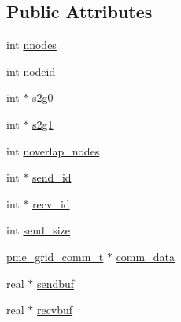 \subsection*{\-Public \-Attributes}
\begin{DoxyCompactItemize}
\item 
int \hyperlink{structpme__overlap__t_aab1253dd168f8d94596643992350eb35}{nnodes}
\item 
int \hyperlink{structpme__overlap__t_a71adcd10d8a5abeae8dedd2e5b2d7cdf}{nodeid}
\item 
int $\ast$ \hyperlink{structpme__overlap__t_a4df4340822bbd3999ce7d8ec995820c5}{s2g0}
\item 
int $\ast$ \hyperlink{structpme__overlap__t_ae524a5a97f3e18aa1b07e5f4bb22eb2b}{s2g1}
\item 
int \hyperlink{structpme__overlap__t_a4431163e973cd6b45abc7f4c086e2b30}{noverlap\-\_\-nodes}
\item 
int $\ast$ \hyperlink{structpme__overlap__t_a2941940e1b7cb6afda3dab3a1ed8ef34}{send\-\_\-id}
\item 
int $\ast$ \hyperlink{structpme__overlap__t_aa574d9a0f6f82ad3594ad339dd5fa826}{recv\-\_\-id}
\item 
int \hyperlink{structpme__overlap__t_abf157c721d2caaec1d85d7f69d4746b4}{send\-\_\-size}
\item 
\hyperlink{structpme__grid__comm__t}{pme\-\_\-grid\-\_\-comm\-\_\-t} $\ast$ \hyperlink{structpme__overlap__t_a911f9bdc93aba7e4092abbe9df787b88}{comm\-\_\-data}
\item 
real $\ast$ \hyperlink{structpme__overlap__t_ac7737fe8ba844936b3db27660031d2d5}{sendbuf}
\item 
real $\ast$ \hyperlink{structpme__overlap__t_a81253882684f486f1aafda3ba7deca62}{recvbuf}
\end{DoxyCompactItemize}


